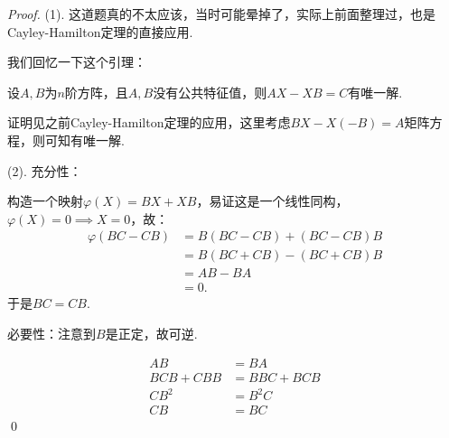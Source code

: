 \begin{proof}
	(1).
	这道题真的不太应该，当时可能晕掉了，实际上前面整理过，也是Cayley-Hamilton定理的直接应用.

	我们回忆一下这个引理：
	\begin{lemma}
		设$A,B$为$n$阶方阵，且$A,B$没有公共特征值，则$AX-XB=C$有唯一解.
	\end{lemma}
	证明见之前Cayley-Hamilton定理的应用，这里考虑$BX-X(-B)=A$矩阵方程，则可知有唯一解.

	(2). 
	充分性：

	构造一个映射$\varphi(X)=BX+XB$，易证这是一个线性同构，$\varphi(X)=0 \implies X=0$，故：
	\begin{align*}
		\varphi(BC-CB) &= B(BC-CB) + (BC-CB)B \\
		&= B(BC+CB) - (BC+CB)B \\
		&= AB - BA \\
		&= 0.
	\end{align*}
	于是$BC=CB$.

	必要性：注意到$B$是正定，故可逆.

	\begin{align*}
		AB&=BA \\
		BCB + CBB &= BBC + BCB \\	
		CB^2 &= B^2 C\\
		CB&=BC
	\end{align*}
	\qed{}
\end{proof}